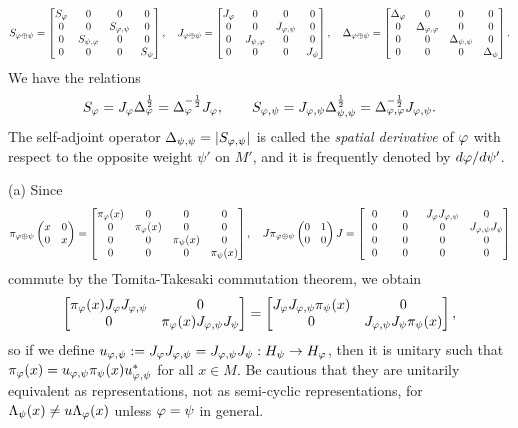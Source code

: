 \documentclass{../../../small}
\begin{document}
\begin{pf}
\[S_{\f\oplus\psi}=\mat[b]{
S_\f&0&0&0\\
0&0&S_{\f,\psi}&0\\
0&S_{\psi,\f}&0&0\\
0&0&0&S_\psi},\quad
J_{\f\oplus\psi}=\mat[b]{
J_\f&0&0&0\\
0&0&J_{\f,\psi}&0\\
0&J_{\psi,\f}&0&0\\
0&0&0&J_\psi},\quad
\Delta_{\f\oplus\psi}=\mat[b]{
\Delta_\f&0&0&0\\
0&\Delta_{\f,\f}&0&0\\
0&0&\Delta_{\psi,\psi}&0\\
0&0&0&\Delta_\psi}.\]
We have the relations
\[S_\f=J_\f\Delta_\f^{\frac12}=\Delta_\f^{-\frac12}J_\f,\qquad S_{\f,\psi}=J_{\f,\psi}\Delta_{\psi,\psi}^{\frac12}=\Delta_{\f,\f}^{-\frac12}J_{\f,\psi}.\]
The self-adjoint operator $\Delta_{\psi,\psi}=|S_{\f,\psi}|$ is called the \emph{spatial derivative} of $\f$ with respect to the opposite weight $\psi'$ on $M'$, and it is frequently denoted by $d\f/d\psi'$.



(a)
Since
\[\pi_{\f\oplus\psi}\mat{x&0\\0&x}=\mat[b]{
\pi_\f(x)&0&0&0\\
0&\pi_\f(x)&0&0\\
0&0&\pi_\psi(x)&0\\
0&0&0&\pi_\psi(x)},\quad
J\pi_{\f\oplus\psi}\mat{0&1\\0&0}J=\mat[b]{
\ \ 0\ \ &\ \ 0\ \ &J_\f J_{\f,\psi}&0\\
0&0&0&J_{\f,\psi}J_\psi\\
0&0&0&0\\
0&0&0&0}\]
commute by the Tomita-Takesaki commutation theorem, we obtain
\[\mat[b]{\pi_\f(x)J_\f J_{\f,\psi}&0\\0&\pi_\f(x)J_{\f,\psi}J_\psi}=\mat[b]{J_\f J_{\f,\psi}\pi_\psi(x)&0\\0&J_{\f,\psi}J_\psi\pi_\psi(x)},\]
so if we define $u_{\f,\psi}:=J_\f J_{\f,\psi}=J_{\f,\psi}J_\psi:H_\psi\to H_\f$, then it is unitary such that $\pi_\f(x)=u_{\f,\psi}\pi_\psi(x)u_{\f,\psi}^*$ for all $x\in M$.
Be cautious that they are unitarily equivalent as representations, not as semi-cyclic representations, for $\Lambda_\psi(x)\ne u\Lambda_\f(x)$ unless $\f=\psi$ in general.


\end{pf}
\end{document}

